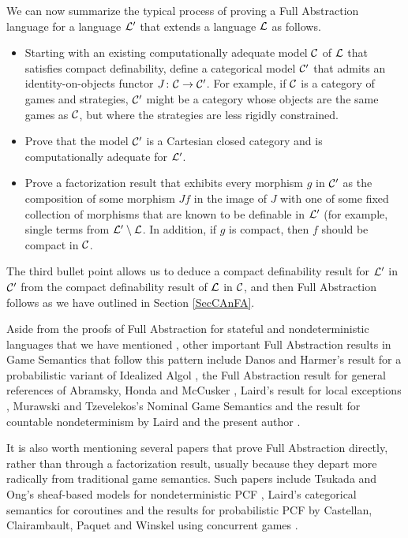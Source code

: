 \documentclass[11pt]{report}
\begin{document}
We can now summarize the typical process of proving a Full Abstraction language for a language $\mathcal L'$ that extends a language $\mathcal L$ as follows.
\begin{itemize}
  \item Starting with an existing computationally adequate model ${\mathcal{C}}$ of $\mathcal L$ that satisfies compact definability, define a categorical model ${\mathcal{C}}'$ that admits an identity-on-objects functor $J\colon {\mathcal{C}} \to {\mathcal{C}}'$.  
    For example, if ${\mathcal{C}}$ is a category of games and strategies, ${\mathcal{C}}'$ might be a category whose objects are the same games as ${\mathcal{C}}$, but where the strategies are less rigidly constrained.
  \item Prove that the model ${\mathcal{C}}'$ is a Cartesian closed category and is computationally adequate for $\mathcal L'$.
  \item Prove a factorization result that exhibits every morphism $g$ in ${\mathcal{C}}'$ as the composition of some morphism $Jf$ in the image of $J$ with one of some fixed collection of morphisms that are known to be definable in $\mathcal L'$ (for example, single terms from $\mathcal L'\setminus\mathcal L$.
    In addition, if $g$ is compact, then $f$ should be compact in ${\mathcal{C}}$.
\end{itemize}
The third bullet point allows us to deduce a compact definability result for $\mathcal L'$ in ${\mathcal{C}}'$ from the compact definability result of $\mathcal L$ in ${\mathcal{C}}$, and then Full Abstraction follows as we have outlined in Section \ref{SecCAnFA}.

Aside from the proofs of Full Abstraction for stateful and nondeterministic languages that we have mentioned \cite{SamsonGuyIAActive,mcCHFiniteND}, other important Full Abstraction results in Game Semantics that follow this pattern include Danos and Harmer's result for a probabilistic variant of Idealized Algol \cite{DanosHarmer}, the Full Abstraction result for general references of Abramsky, Honda and McCusker \cite{HondaMcCusker}, Laird's result for local exceptions \cite{LLi}, Murawski and Tzevelekos's Nominal Game Semantics \cite{NGS} and the result for countable nondeterminism by Laird and the present author \cite{CslPaper}.

It is also worth mentioning several papers that prove Full Abstraction directly, rather than through a factorization result, usually because they depart more radically from traditional game semantics.  
Such papers include Tsukada and Ong's sheaf-based models for nondeterministic PCF \cite{TsukadaSheaves,Sheaves}, Laird's categorical semantics for coroutines \cite{FunctionalProgramsAsCoroutines} and the results for probabilistic PCF by Castellan, Clairambault, Paquet and Winskel using concurrent games \cite{PPCF}.
\end{document}
